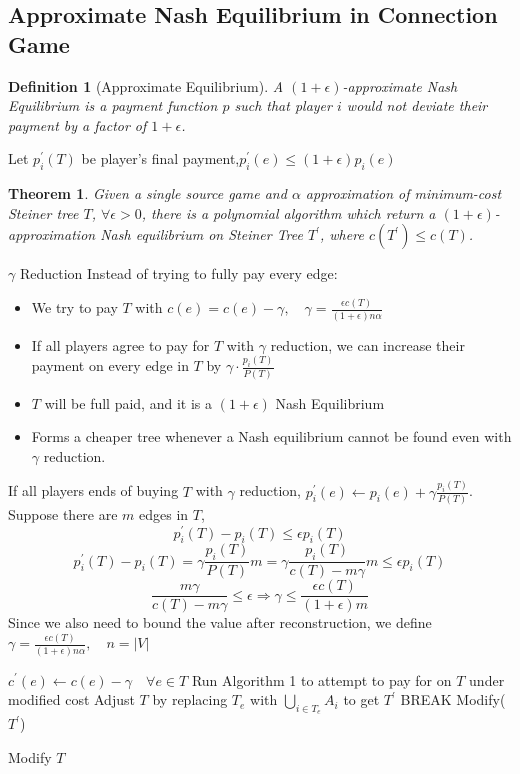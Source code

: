 \documentclass[11pt,psfig,times]{article}
\newtheorem{theorem}{Theorem}[section]
\newtheorem{definition}{Definition}[section]
\begin{document}
	\subsection{Approximate Nash Equilibrium in Connection Game}
		\begin{definition}[Approximate Equilibrium]
			A \((1+\epsilon)\)-approximate Nash Equilibrium is a payment function \(p\) such that player \(i\) would not deviate their payment by a factor of \(1+\epsilon\).
		\end{definition}
		Let $ p_i^{'}(T)$ be player's final payment,$ p_i^{'}(e) \leq (1+\epsilon)p_i(e)$
	
	
		\begin{theorem}
			Given a single source game and \(\alpha\) approximation of minimum-cost Steiner tree \(T\), \(\forall \epsilon > 0\), there is a polynomial algorithm which return a \((1+\epsilon)\)-approximation \textit{Nash equilibrium} on Steiner Tree \(T^{'}\), where $c(T^{'}) \leq c(T)$.
		\end{theorem}
	
	
	{$\gamma$ Reduction}
		Instead of trying to fully pay every edge: 
		\begin{itemize}
			\item We try to pay $T$ with $c(e) = c(e) - \gamma, \quad \gamma = \frac{\epsilon c(T)}{(1+\epsilon)n\alpha}$
			\item If all players agree to pay for $T$ with $\gamma$ reduction, we can increase their payment on every edge in $T$ by $\gamma \cdot \frac{p_i(T)}{P(T)}$
			\item $T$ will be full paid, and it is a $(1+\epsilon)$ Nash Equilibrium
			\item Forms a cheaper tree whenever a Nash equilibrium cannot be found even with $\gamma$ reduction.
		\end{itemize}
	
	
	If all players ends of buying  $T$ with $\gamma$ reduction, $p_i^{'}(e) \gets p_i(e) + \gamma\frac{p_i(T)}{P(T)}$.\\
	Suppose there are $m$ edges in $T$,
	\[p_i^{'}(T) - p_i(T) \leq \epsilon p_i(T)\]
	\[p_i^{'}(T) - p_i(T) =  \gamma\frac{p_i(T)}{P(T)}m =  \gamma\frac{p_i(T)}{c(T)-m\gamma}m \leq \epsilon p_i(T)\]
	\[ \frac{m\gamma}{c(T)-m\gamma} \leq \epsilon \Rightarrow \gamma \leq \frac{\epsilon c(T)}{(1+\epsilon)m}\]
	Since we also need to bound the value after reconstruction, we define $\gamma = \frac{\epsilon c(T)}{(1+\epsilon)n\alpha},\quad n = |V|$
	
	
		\begin{algorithm}[H]
			\begin{algorithmic}[2]
				\STATE $c^{'}(e) \gets  c(e) -\gamma \quad \forall e \in T$
				\STATE Run Algorithm 1 to attempt to pay for on $T$ under modified cost
				\STATE  Adjust \( T\) by replacing \(T_e\) with  \(\bigcup_{i\in T_e} A_i\) to get \(T^{'}\)
				\STATE BREAK
				\ENDIF
				\ENDWHILE
				\STATE Modify($T^{'}$)
			   
			\end{algorithmic}
			\caption{Modify $T$ }
			\end{algorithm}
	
\end{document}
